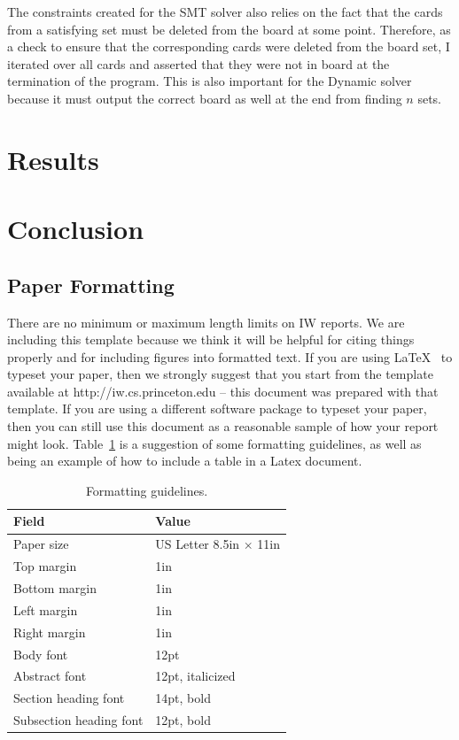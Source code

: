\documentclass[pageno]{jpaper}
\begin{document}
The constraints created for the SMT solver also relies on the fact that the cards from a satisfying set must be deleted from the board at some point. Therefore, as a check to ensure that the corresponding cards were deleted from the board set, I iterated over all cards and asserted that they were not in board at the termination of the program. This is also important for the Dynamic solver because it must output the correct board as well at the end from finding $n$ sets. 

\section{Results}


\section{Conclusion}









\subsection{Paper Formatting}
\label{section:formatting}

There are no minimum or maximum length limits on IW reports.  
We are including this template because we think it will be helpful
for citing things properly and for including figures into formatted
text.  If you are using \LaTeX~\cite{lamport94} 
to typeset your paper, then we strongly suggest
that you start from the template available at
http://iw.cs.princeton.edu -- this
document was prepared with that template.  
If you are using a different software package to typeset your paper, 
then you can still use this document as a reasonable sample of 
how your report might look.  Table~\ref{table:formatting} is a suggestion
of some formatting guidelines, as well as being an example of how to
include a table in a Latex document.

\begin{table}[hbt]
  \centering
  \begin{tabular}{|l|l|}
    \hline
    \textbf{Field} & \textbf{Value}\\
    \hline
    \hline
    Paper size & US Letter 8.5in $\times$ 11in\\
    \hline
    Top margin & 1in\\
    \hline
    Bottom margin & 1in\\
    \hline
    Left margin & 1in\\
    \hline
    Right margin & 1in\\
    \hline
    Body font & 12pt\\
    \hline
    Abstract font & 12pt, italicized\\
    \hline
    Section heading font & 14pt, bold\\
    \hline
    Subsection heading font & 12pt, bold\\
    \hline
  \end{tabular}
  \caption{Formatting guidelines. }
  \label{table:formatting}
\end{table}
\end{document}
